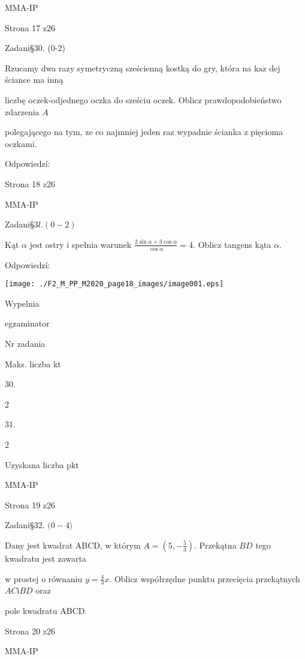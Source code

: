 \documentclass[a4paper,12pt]{article}
\begin{document}
MMA-IP

Strona 17 z26





Zadani\S 30. (0-2)

Rzucamy dwa razy symetryczną sześcienną kostką do gry, która na $\mathrm{k}\mathrm{a}\dot{\mathrm{z}}$ dej ściance ma inną

liczbę oczek-odjednego oczka do sześciu oczek. Oblicz prawdopodobieństwo zdarzenia $A$

polegającego na tym, ze co najmniej jeden raz wypadnie ścianka z pięcioma oczkami.

Odpowiedzí:

Strona 18 z26

MMA-IP





Zadani\S $3l. (0-2)$

Kąt $\alpha$ jest ostry i spełnia warunek $\displaystyle \frac{2\sin\alpha+3\cos\alpha}{\cos\alpha}=4$. Oblicz tangens kąta $\alpha.$

Odpowiedzí:
\begin{center}
\texttt{[image: ./F2\_M\_PP\_M2020\_page18\_images/image001.eps]}
\end{center}
Wypelnia

egzaminator

Nr zadania

Maks. liczba kt

30.

2

31.

2

Uzyskana liczba pkt

MMA-IP

Strona 19 z26





Zadani\S 32. $(0-4\rangle$

Dany jest kwadrat ABCD, w którym $A=(5,-\displaystyle \frac{5}{3})$. Przekątna $BD$ tego kwadratu jest zawarta

w prostej o równaniu $y=\displaystyle \frac{4}{3}x$. Oblicz współrzędne punktu przecięcia przekątnych $AC\mathrm{i}BD$ oraz

pole kwadratu ABCD.

Strona 20 z26

MMA-IP
\end{document}
